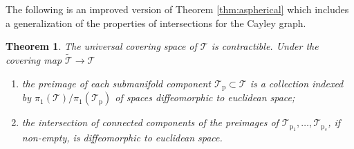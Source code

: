 \documentclass[reqno]{amsart}
\newcommand{\p}{\mathrm{p}}
\newcommand{\cT}{\mathcal{T}}
\newtheorem{theorem}{Theorem}[section]
\begin{document}
The following is an improved version of Theorem \ref{thm:aspherical} which includes a generalization of the properties of intersections for the Cayley graph.

\begin{theorem}\label{thm:aspherical-algebraic-topology}
 The universal covering space of $\cT$ is contractible. Under the covering map $\widetilde{\cT}\to \cT$
 \begin{enumerate}
  \item the preimage of each submanifold component $\cT_\p\subset \cT$ is a collection indexed by $\pi_1(\cT)/\pi_1(\cT_\p)$ of spaces diffeomorphic to euclidean space;
  \item the intersection of connected components of the preimages of $\cT_{\p_1},\dots,\cT_{\p_s}$, if non-empty, is diffeomorphic to euclidean space.
 \end{enumerate}
\end{theorem}
\end{document}
